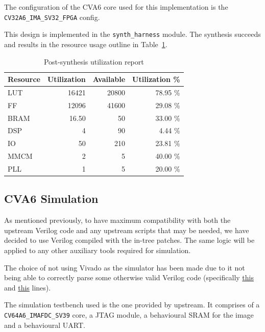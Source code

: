 \documentclass[a4paper,11pt]{article}
\begin{document}
The configuration of the CVA6 core used for this implementation is the
\texttt{CV32A6\_IMA\_SV32\_FPGA} config.

This design is implemented in the \texttt{synth\_harness} module. The synthesis
succeeds and results in the resource usage outline in Table~\ref{synth-util}.

\begin{table}[H]
  \centering
  \begin{tabular}{lrrr}
    \toprule
    Resource & Utilization & Available & Utilization \% \\\midrule
    LUT      & 16421       & 20800     & 78.95 \% \\
    FF       & 12096       & 41600     & 29.08 \% \\
    BRAM     & 16.50       & 50        & 33.00 \% \\
    DSP      & 4           & 90        &  4.44 \% \\
    IO       & 50          & 210       & 23.81 \% \\
    MMCM     & 2           & 5         & 40.00 \% \\
    PLL      & 1           & 5         & 20.00 \% \\
    \bottomrule
  \end{tabular}
  \caption{Post-synthesis utilization report}%
  \label{synth-util}
\end{table}

\subsection{CVA6 Simulation}

As mentioned previously, to have maximum compatibility with both the upstream
Verilog code and any upstream scripts that may be needed, we have decided to use
Verilog compiled with the in-tree patches. The same logic will be applied to any
other auxiliary tools required for simulation.

The choice of not using Vivado as the simulator
has been made due to it not being able to correctly parse some otherwise valid
Verilog code (specifically
\href{https://github.com/openhwgroup/cva6/blob/db088159ebca1480b3c5f083f5ac4268ea6749b6/vendor/pulp-platform/common_cells/include/common_cells/registers.svh#L47}{this} and
\href{https://github.com/openhwgroup/cva6/blob/db088159ebca1480b3c5f083f5ac4268ea6749b6/vendor/pulp-platform/common_cells/include/common_cells/registers.svh#L125}{this} lines).

The simulation testbench used is the one provided by upstream. It comprises of a
\texttt{CV64A6\_IMAFDC\_SV39} core, a JTAG module, a behavioural SRAM for the
image and a behavioural UART.
\end{document}

